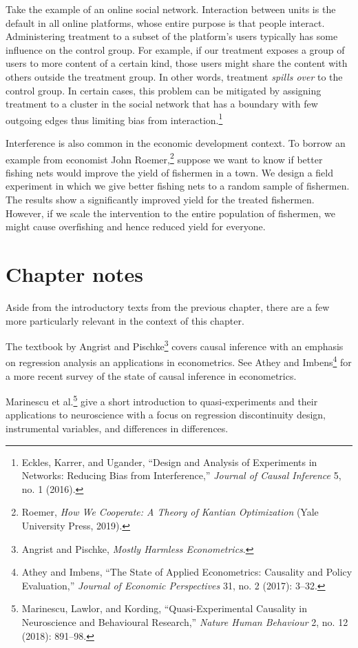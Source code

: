 \documentclass{tufte-book}
\begin{document}
Take the example of an online social network. Interaction between units
is the default in all online platforms, whose entire purpose is that
people interact. Administering treatment to a subset of the platform's
users typically has some influence on the control group. For example, if
our treatment exposes a group of users to more content of a certain
kind, those users might share the content with others outside the
treatment group. In other words, treatment \emph{spills over} to the
control group. In certain cases, this problem can be mitigated by
assigning treatment to a cluster in the social network that has a
boundary with few outgoing edges thus limiting bias from
interaction.\footnote{Eckles, Karrer, and Ugander, {``Design and
  Analysis of Experiments in Networks: Reducing Bias from
  Interference,''} \emph{Journal of Causal Inference} 5, no. 1 (2016).}

Interference is also common in the economic development context. To
borrow an example from economist John Roemer,\footnote{Roemer, \emph{How
  We Cooperate: A Theory of Kantian Optimization} (Yale University
  Press, 2019).} suppose we want to know if better fishing nets would
improve the yield of fishermen in a town. We design a field experiment
in which we give better fishing nets to a random sample of fishermen.
The results show a significantly improved yield for the treated
fishermen. However, if we scale the intervention to the entire
population of fishermen, we might cause overfishing and hence reduced
yield for everyone.

\hypertarget{chapter-notes-9}{%
\section{Chapter notes}\label{chapter-notes-9}}

Aside from the introductory texts from the previous chapter, there are a
few more particularly relevant in the context of this chapter.

The textbook by Angrist and Pischke\footnote{Angrist and Pischke,
  \emph{Mostly Harmless Econometrics}.} covers causal inference with an
emphasis on regression analysis an applications in econometrics. See
Athey and Imbens\footnote{Athey and Imbens, {``The State of Applied
  Econometrics: Causality and Policy Evaluation,''} \emph{Journal of
  Economic Perspectives} 31, no. 2 (2017): 3--32.} for a more recent
survey of the state of causal inference in econometrics.

Marinescu et al.\footnote{Marinescu, Lawlor, and Kording,
  {``Quasi-Experimental Causality in Neuroscience and Behavioural
  Research,''} \emph{Nature Human Behaviour} 2, no. 12 (2018): 891--98.}
give a short introduction to quasi-experiments and their applications to
neuroscience with a focus on regression discontinuity design,
instrumental variables, and differences in differences.
\end{document}
